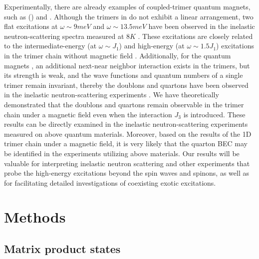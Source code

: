 \documentclass[aps,prx,showpacs,floatfix,twocolumn,superscriptaddress,nofootinbib,longbibliography]{revtex4-2}
\begin{document}
 Experimentally, there are already examples of coupled-trimer quantum magnets, such as   
 () \cite{PhysRevB.71.144411,drillon19931d,belik2005long,PhysRevB.76.014409} and  \cite{bera2022emergent}. Although  the trimers in   do not exhibit a linear arrangement,
 two flat excitations at $ \omega \sim 9 meV$ and $ \omega  \sim 13.5 meV$  have been observed in the inelastic neutron-scattering spectra measured at $8K$   \cite{PhysRevB.71.144411}. These excitations  are closely related to the intermediate-energy (at $ \omega \sim J_1$) and high-energy (at $ \omega \sim 1.5 J_1$) excitations  in the trimer chain without magnetic field \cite{cheng2022}. Additionally, for the quantum magnets ,  an additional next-near neighbor interaction exists in the trimers, but its strength is weak, and  the wave functions  and quantum numbers of a single trimer remain invariant, thereby the doublons and quartons have been observed in the inelastic neutron-scattering experiments \cite{bera2022emergent}. We have theoretically demonstrated that the doublons and quartons remain observable in the trimer chain under a magnetic field even when the interaction $J_3$ is introduced.  
 These results can be directly examined in the inelastic neutron-scattering experiments measured on above quantum materials. 
 Moreover, based on the results of the 1D trimer chain under a magnetic field, it is very likely that the quarton BEC may be  identified in the experiments utilizing above  materials.
 Our results will be valuable for interpreting inelastic neutron scattering and other experiments that
 probe the high-energy excitations beyond the spin waves and spinons, as well as for facilitating detailed investigations of coexisting exotic excitations.


\section{Methods}\label{method}
\subsection{Matrix product states}
\end{document}
